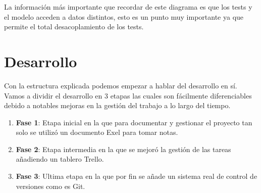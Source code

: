 \documentclass[12pt,a4paper]{article}
\begin{document}
	La información más importante que recordar de este diagrama es que los tests y el modelo acceden a datos distintos, esto es un punto muy importante ya que permite el total desacoplamiento de los tests.


\pagebreak

	\section{Desarrollo}
	Con la estructura explicada podemos empezar a hablar del desarrollo en sí. Vamos a dividir el desarrollo en 3 etapas las cuales son fácilmente diferenciables debido a notables mejoras en la gestión del trabajo a lo largo del tiempo.\\
	\begin{enumerate}
	\item \textbf{Fase 1}: Etapa inicial en la que para documentar y gestionar el proyecto tan solo se utilizó un documento Exel para tomar notas.
	\item \textbf{Fase 2}: Etapa intermedia en la que se mejoró la gestión de las tareas añadiendo un tablero Trello.
	\item \textbf{Fase 3}: Ultima etapa en la que por fin se añade un sistema real de control de versiones como es Git.
	\end{enumerate}
\end{document}

